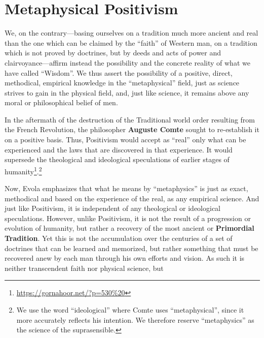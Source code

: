 \section{Metaphysical Positivism}

\begin{quotex}
We, on the contrary---basing ourselves on a tradition much more ancient and real than the one which can be claimed by the ``faith'' of Western man, on a tradition which is not proved by doctrines, but by deeds and acts of power and clairvoyance---affirm instead the possibility and the concrete reality of what we have called ``Wisdom''. We thus assert the possibility of a positive, direct, methodical, empirical knowledge in the ``metaphysical'' field, just as science strives to gain in the physical field, and, just like science, it remains above any moral or philosophical belief of men.

\end{quotex}


In the aftermath of the destruction of the Traditional world order resulting from the French Revolution, the philosopher \textbf{Auguste Comte} sought to re-establish it on a positive basis. Thus, Positivism would accept as ``real'' only what can be experienced and the laws that are discovered in that experience. It would supersede the theological and ideological speculations of earlier stages of humanity\footnote{\url{https://gornahoor.net/?p=530\%20}}.\footnote{We use the word ``ideological'' where Comte uses ``metaphysical'', since it more accurately reflects his intention. We therefore reserve ``metaphysics'' as the science of the suprasensible.}

Now, Evola emphasizes that what he means by ``metaphysics'' is just as exact, methodical and based on the experience of the real, as any empirical science. And just like Positivism, it is independent of any theological or ideological speculations. However, unlike Positivism, it is not the result of a progression or evolution of humanity, but rather a recovery of the most ancient or \textbf{Primordial Tradition}. Yet this is not the accumulation over the centuries of a set of doctrines that can be learned and memorized, but rather something that must be recovered anew by each man through his own efforts and vision. As such it is neither transcendent faith nor physical science, but

